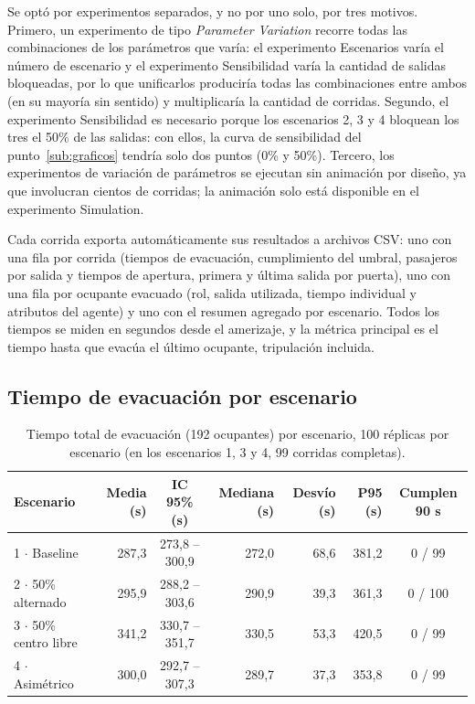 \documentclass[a4paper, 11pt]{article}
\newif\ifmostraravisos
\newcommand{\pendiente}{%
  \ifmostraravisos
    \par\medskip\noindent
    \colorbox{yellow}{\parbox{\dimexpr\linewidth-2\fboxsep\relax}{\small\textbf{[ESTOS DATOS SON ANTES DE TERMINAR EL PROYECTO, UNA VEZ TERMINADO VOLVER A ESCRIBIR ESTA CONCLUSIÓN/FOTO]}}}%
    \par\medskip
  \fi}
\begin{document}
Se opt\'o por experimentos separados, y no por uno solo, por tres motivos. Primero,
un experimento de tipo \textit{Parameter Variation} recorre todas las combinaciones
de los par\'ametros que var\'ia: el experimento Escenarios var\'ia el n\'umero de
escenario y el experimento Sensibilidad var\'ia la cantidad de salidas bloqueadas,
por lo que unificarlos producir\'ia todas las combinaciones entre ambos (en su
mayor\'ia sin sentido) y multiplicar\'ia la cantidad de corridas. Segundo, el
experimento Sensibilidad es necesario porque los escenarios 2, 3 y 4 bloquean los
tres el 50\% de las salidas: con ellos, la curva de sensibilidad del punto~\ref{sub:graficos}
tendr\'ia solo dos puntos (0\% y 50\%). Tercero, los experimentos de variaci\'on de
par\'ametros se ejecutan sin animaci\'on por dise\~no, ya que involucran cientos de
corridas; la animaci\'on solo est\'a disponible en el experimento Simulation.

Cada corrida exporta autom\'aticamente sus resultados a archivos CSV: uno con una
fila por corrida (tiempos de evacuaci\'on, cumplimiento del umbral, pasajeros por
salida y tiempos de apertura, primera y \'ultima salida por puerta), uno con una
fila por ocupante evacuado (rol, salida utilizada, tiempo individual y atributos del
agente) y uno con el resumen agregado por escenario. Todos los tiempos se miden en
segundos desde el amerizaje, y la m\'etrica principal es el tiempo hasta que evac\'ua
el \'ultimo ocupante, tripulaci\'on incluida.

\subsection{Tiempo de evacuaci\'on por escenario}\label{sub:res_escenarios}

\begin{table}[H]
\pendiente
\centering
\small
\begin{tabular}{lrcrrrc}
\toprule
\textbf{Escenario} & \textbf{Media (s)} & \textbf{IC 95\% (s)} & \textbf{Mediana (s)} & \textbf{Desv\'io (s)} & \textbf{P95 (s)} & \textbf{Cumplen 90 s} \\
\midrule
1 $\cdot$ Baseline            & 287,3 & 273,8 -- 300,9 & 272,0 & 68,6  & 381,2 & 0 / 99 \\
2 $\cdot$ 50\% alternado      & 295,9 & 288,2 -- 303,6 & 290,9 & 39,3  & 361,3 & 0 / 100 \\
3 $\cdot$ 50\% centro libre   & 341,2 & 330,7 -- 351,7 & 330,5 & 53,3  & 420,5 & 0 / 99 \\
4 $\cdot$ Asim\'etrico        & 300,0 & 292,7 -- 307,3 & 289,7 & 37,3  & 353,8 & 0 / 99 \\
\bottomrule
\end{tabular}
\caption{Tiempo total de evacuaci\'on (192 ocupantes) por escenario, 100 r\'eplicas
por escenario (en los escenarios 1, 3 y 4, 99 corridas completas).}
\label{tab:res_escenarios}
\end{table}
\end{document}
